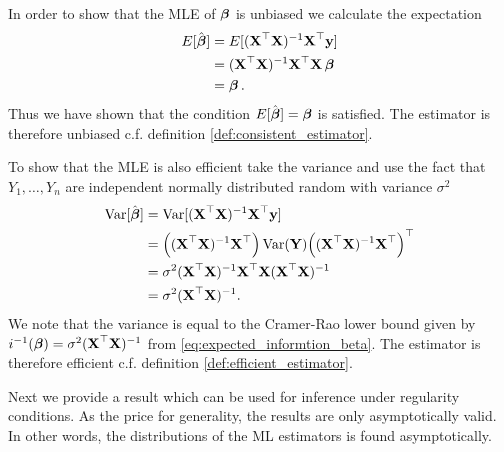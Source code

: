 \begin{example}
In order to show that the MLE of $\operatorname{\boldsymbol{\beta}}$ is unbiased we calculate the expectation
\begin{align*}
    E[\hat{\operatorname{\boldsymbol{\beta}}}]&=E[(\textbf{X}^\top\textbf{X})^{-1}\textbf{X}^\top \textbf{y}] \\
    &=(\textbf{X}^\top\textbf{X})^{-1}\textbf{X}^\top \textbf{X}\operatorname{\boldsymbol{\beta}} \\
    &= \operatorname{\boldsymbol{\beta}}.
\end{align*}
Thus we have shown that the condition $E[\hat{\operatorname{\boldsymbol{\beta}}}] = \operatorname{\boldsymbol{\beta}}$ is satisfied. The estimator is therefore unbiased c.f. definition \ref{def:consistent_estimator}.


To show that the MLE is also efficient take the variance and use the fact that $Y_1,\ldots,Y_n$ are independent normally distributed random with variance $\sigma^2$
\begin{align*}
\operatorname{\text{Var}}[\hat{\operatorname{\boldsymbol{\beta}}}]&=\operatorname{\text{Var}}[(\textbf{X}^\top\textbf{X})^{-1}\textbf{X}^\top \textbf{y}] \\
&=\Big((\textbf{X}^\top\textbf{X})^{-1}\textbf{X}^\top \Big) \operatorname{\text{Var}}(\textbf{Y}) \Big((\textbf{X}^\top\textbf{X})^{-1}\textbf{X}^\top\Big)^\top\\
&= \sigma^2 (\textbf{X}^\top\textbf{X})^{-1}\textbf{X}^\top\textbf{X}(\textbf{X}^\top\textbf{X})^{-1} \\
&= \sigma^2 (\textbf{X}^\top\textbf{X})^{-1}.
\end{align*}
We note that the variance is equal to the Cramer-Rao lower bound given by $i^{-1}(\operatorname{\boldsymbol{\beta}})=\sigma^2 (\textbf{X}^\top\textbf{X})^{-1}$ from \eqref{eq:expected_informtion_beta}. The estimator is therefore efficient c.f. definition \ref{def:efficient_estimator}.
\end{example}

Next we provide a result which can be used for inference under regularity conditions. 
As the price for generality, the results are only asymptotically valid. 
In other words, the distributions of the ML estimators is found asymptotically. 

